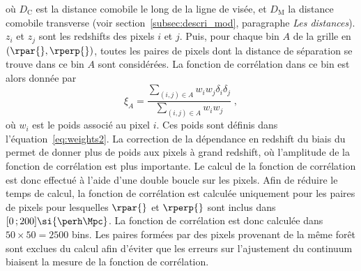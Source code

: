 où $D_{\mathrm{C}}$ est la distance comobile le long de la ligne de visée, et $D_{\mathrm{M}}$ la distance comobile transverse (voir section~\ref{subsec:descri_mod}, paragraphe \emph{Les distances}). $z_i$ et $z_j$ sont les redshifts des pixels $i$ et $j$.
Puis, pour chaque bin $A$ de la grille en $(\rpar{}, \rperp{})$, toutes les paires de pixels dont la distance de séparation se trouve dans ce bin $A$ sont considérées. La fonction de corrélation dans ce bin est alors donnée par
\begin{equation}
  \label{eq:xiff}
  \xi_A = \frac{
    \sum\limits_{(i,j)\in A} w_i w_j \delta_i \delta_j
  }{
    \sum\limits_{(i,j)\in A} w_i w_j
  }
  \; ,
\end{equation}
où $w_i$ est le poids associé au pixel $i$. Ces poids sont définis dans l'équation~\ref{eq:weights2}. La correction de la dépendance en redshift du biais du \lya{} permet de donner plus de poids aux pixels à grand redshift, où l'amplitude de la fonction de corrélation est plus importante.
Le calcul de la fonction de corrélation est donc effectué à l'aide d'une double boucle sur les pixels.
Afin de réduire le temps de calcul, la fonction de corrélation est calculée uniquement pour les paires de pixels pour lesquelles $\rpar{}$ et $\rperp{}$ sont inclus dans $[0 \, ; 200] \si{\perh\Mpc}$. La fonction de corrélation est donc calculée dans $50 \times 50 = \num{2500}$ bins.
Les paires formées par des pixels provenant de la même forêt sont exclues du calcul afin d'éviter que les erreurs sur l'ajustement du continuum biaisent la mesure de la fonction de corrélation.


